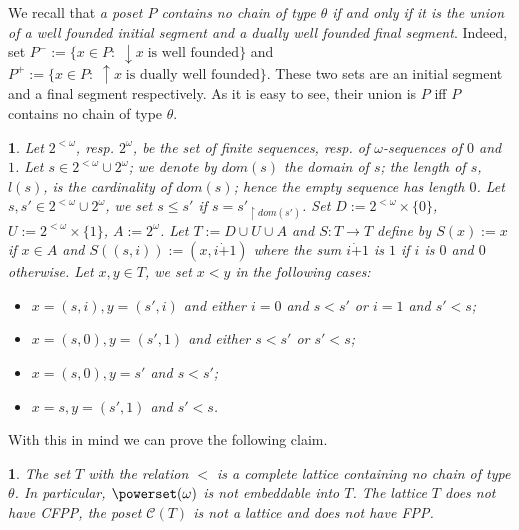 \documentclass[12pt]{amsart}
\newtheorem{claim}[definition]{\noindent {\bf Claim}}
\newtheorem{example}[definition]{\noindent {\bf Example}}
\begin{document}
  
We recall that \emph{a poset $P$ contains no chain of type $\theta$ if
and only if it is the union of a well founded initial segment and a
dually well founded final segment}. Indeed, set $P^{-}:= \{ x\in P: \; 
 {\downarrow \!\!} x\; \text{is well founded} \}$ and $P^{+}:=\{ x\in P: \; 
{\uparrow \!\!} x\; \text{is dually well founded}\}$. These two sets
are an initial segment and a final segment respectively. As it is easy
to see, their union is $P$ iff $P$ contains no chain of type $\theta$.
 
\begin{example}\label{example:robert}
Let $2^{<\omega}$, resp. $2^{\omega}$, be the set of finite sequences,
resp. of $\omega$-sequences of $0$ and $1$. Let $s\in 2^{<\omega}\cup
2^{\omega}$; we denote by $dom(s)$ the domain of $s$; the \emph{length}
of $s$, $l(s)$, is the cardinality of $dom(s)$; hence the empty
sequence has length $0$. Let $s, s'\in 2^{<\omega}\cup 2^{\omega}$, we
set $s\leq s'$ if $s=s'_{\restriction dom(s')}$. Set $D:=
2^{<\omega}\times \{0\}$, $U:=2^{<\omega}\times \{1\}$,
$A:=2^{\omega}$.  Let $T:= D\cup U\cup A$ and $S:T\rightarrow T$ define
by $S(x):=x$ if $x\in A$ and $S((s, i)):=(x, i\dot{+}1)$ where the sum
$i\dot{+}1$ is $1$ if $i$ is $0$ and $0$ otherwise. Let $x, y\in T$,
we set $x<y$ in the following cases:

\begin{itemize}
\item $x=(s, i), y=(s', i)$ and  either  $i=0$ and $s<s'$ or $i=1$ and $s'<s$; 
\item $x=(s, 0), y=(s', 1)$ and either $s<s'$ or $s'<s$;
\item $x=(s, 0), y=s'$ and $s<s'$;
\item $x=s, y=(s', 1)$ and $s'<s$.
\end{itemize}
\end{example}

With this in mind we can prove the following claim. 

\begin{claim}\label{robertexample}
The set $T$ with the relation $<$  is a complete lattice containing no chain of type
$\theta$. In particular, $\powerset(\omega)$ is not embeddable into
$T$. The lattice $T$ does not have CFPP, the poset $\mathcal C(T)$
is not a lattice and does not have FPP.
\end{claim}
\end{document}
